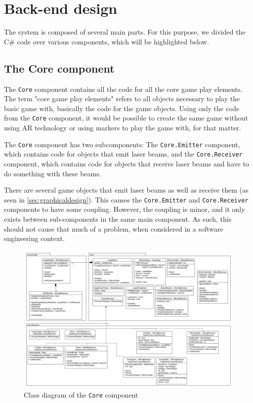	\section{Back-end design} \label{sec:backenddesign}
		The system is composed of several main parts. For this purpose, we divided
		the C\# code over various components, which will be highlighted below.
		
		\subsection{The Core component} \label{ssec:corecomponent}
			The \texttt{Core} component contains all the code for all the core game play
			elements. The term "core game play elements" refers to all objects 
			necessary to play the basic game with, basically the code
			for the game objects. Using only the code from the \texttt{Core} component,
			it would be possible to create the same game without using AR
			technology or using markers to play the game with, for that matter.
			
			The \texttt{Core} component has two subcomponents: The 
			\texttt{Core.Emitter} component, which contains code for objects 
			that emit laser beams, and the \texttt{Core.Receiver} component, 
			which contains code for objects that receive laser beams and have to 
			do something with these beams.
			
			There are several game objects that emit laser beams as well as 
			receive them (as seen in \ref{sec:graphicaldesign}). This causes the
			\texttt{Core.Emitter} and \texttt{Core.Receiver} components to have 
			some coupling. However, the coupling is minor, and it only exists 
			between sub-components in the same main component. As such, this 
			should not cause that much of a problem, when considered in a 
			software engineering context.
			
			\begin{figure}[ht]
				\includegraphics[width=\textwidth]{ClassDiagramCore}
				\caption{Class diagram of the \texttt{Core} component}
				\label{fig:classdiagramcore}
			\end{figure}
			
